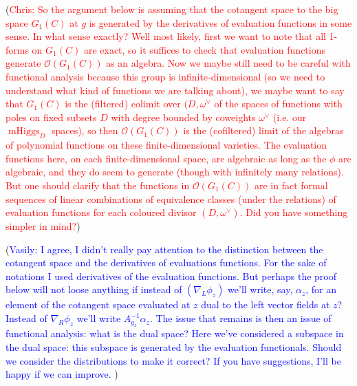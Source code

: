 \documentclass[11pt, oneside, reqno]{amsart}
\theoremstyle{definition} \newtheorem{definition}{Definition}[section]
\theoremstyle{definition} \newtheorem{remark}[definition]{Remark}
\theoremstyle{definition} \newtheorem{remarks}[definition]{Remarks}
\theoremstyle{definition} \newtheorem{question}[definition]{Question}
\theoremstyle{definition} \newtheorem*{note}{Note}
\theoremstyle{definition} \newtheorem{example}[definition]{Example}
\theoremstyle{definition} \newtheorem{examples}[definition]{Examples}
\newcommand{\OO}{\mathcal{O}}
\DeclareMathOperator{\mhiggs}{mHiggs}
\newcommand{\chris}[1]{(\textcolor{red}{Chris: #1})}
\newcommand{\vasily}[1]{(\textcolor{blue}{Vasily: #1})}
\begin{document}
\chris{So the argument below is assuming that the cotangent space to the big space $G_1(C)$ at $g$ is generated by the derivatives of evaluation functions in some sense.  In what sense exactly?  Well most likely, first we want to note that all 1-forms on $G_1(C)$ are exact, so it suffices to check that evaluation functions generate $\OO(G_1(C))$ as an algebra.  Now we maybe still need to be careful with functional analysis because this group is infinite-dimensional (so we need to understand what kind of functions we are talking about), we maybe want to say that $G_1(C)$ is the (filtered) colimit over $(D,\omega^\vee$ of the spaces of functions with poles on fixed subsets $D$ with degree bounded by coweights $\omega^\vee$ (i.e. our $\mhiggs_D$ spaces), so then $\OO(G_1(C))$ is the (cofiltered) limit of the algebras of polynomial functions on these finite-dimensional varieties. The evaluation functions here, on each finite-dimensional space, are algebraic as long as the $\phi$ are algebraic, and they do seem to generate (though with infinitely many relations).  But one should clarify that the functions in $\OO(G_1(C))$ are in fact formal sequences of linear combinations of equivalence classes (under the relations) of evaluation functions for each coloured divisor $(D, \omega^\vee)$.  Did you have something simpler in mind?}

\vasily{I agree, I didn't really pay 
attention to the distinction between the cotangent
  space and the derivatives of evaluations functions. For the
  sake of notations I used derivatives of the evaluation functions.
  But perhaps the proof below will not loose anything if instead
  of $(\nabla_{L} \phi_z)$ we'll write, say, $\alpha_z$, for an element
  of the cotangent space evaluated at $z$ dual to the left
  vector fields at $z$? Instead of $\nabla_{R} \phi_{z}$ we'll write
  $A_{g_{z}}^{-1} \alpha_z$. The issue that remains is then an issue
  of functional analysis: what is the dual space? Here we've considered
  a subspace in the dual space: this subspace
 is generated by the evaluation functionals.
  Should we consider the distributions to make it correct? If
  you have suggestions, I'll be happy if we can improve. 
} 
\end{document}
